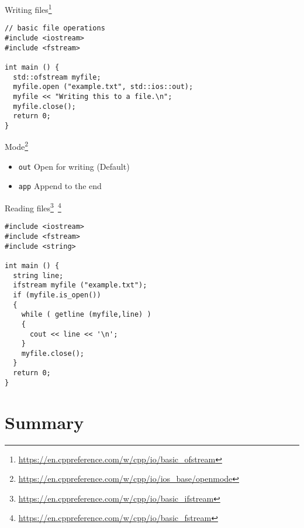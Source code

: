 \documentclass[\classoption]{beamer}
\begin{document}
\begin{frame}[fragile]{Writing files\footnote{\tiny\url{https://en.cppreference.com/w/cpp/io/basic_ofstream}}}

\begin{lstlisting}
// basic file operations
#include <iostream>
#include <fstream>

int main () {
  std::ofstream myfile;
  myfile.open ("example.txt", std::ios::out);
  myfile << "Writing this to a file.\n";
  myfile.close();
  return 0;
}
\end{lstlisting}

\begin{block}{Mode\footnote{\tiny\url{https://en.cppreference.com/w/cpp/io/ios_base/openmode}}}
\begin{itemize}
\item \lstinline|out| Open for writing (Default)
\item \lstinline|app| Append to the end 
\end{itemize}

\end{block}

\end{frame}

\begin{frame}[fragile]{Reading files\footnote{\tiny\url{https://en.cppreference.com/w/cpp/io/basic_ifstream}}~\footnote{\tiny\url{https://en.cppreference.com/w/cpp/io/basic_fstream}}}

\begin{lstlisting}
#include <iostream>
#include <fstream>
#include <string>

int main () {
  string line;
  ifstream myfile ("example.txt");
  if (myfile.is_open())
  {
    while ( getline (myfile,line) )
    {
      cout << line << '\n';
    }
    myfile.close();
  }
  return 0;
}
\end{lstlisting}


\end{frame}

\section{Summary}
\end{document}

